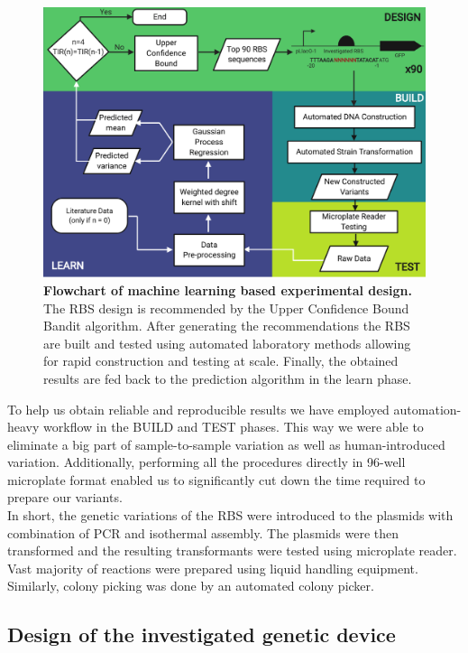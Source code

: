 \documentclass{article}
\begin{document}
\begin{figure}[h]
    \centering
    \includegraphics[scale=0.7]{plots/Main_Paper/flowchart.pdf}
    \caption{\textbf{Flowchart of machine learning based experimental design.} The RBS design is recommended by the Upper Confidence Bound Bandit algorithm. After generating the recommendations the RBS are built and tested using automated laboratory methods allowing for rapid construction and testing at scale. Finally, the obtained results are fed back to the prediction algorithm in the learn phase. }
    \label{fig: Flowchart}
\end{figure}

To help us obtain reliable and reproducible results we have employed automation-heavy workflow in the BUILD and TEST phases.
This way we were able to eliminate a big part of sample-to-sample variation as well as human-introduced variation.
Additionally, performing all the procedures directly in 96-well microplate format enabled us to significantly cut down the time required to prepare our variants.\\
In short, the genetic variations of the RBS were introduced to the plasmids with combination of PCR and isothermal assembly. 
The plasmids were then transformed and the resulting transformants were tested using microplate reader.
Vast majority of reactions were prepared using liquid handling equipment.
Similarly, colony picking was done by an automated colony picker.\\

\subsection{Design of the investigated genetic device}
\end{document}
